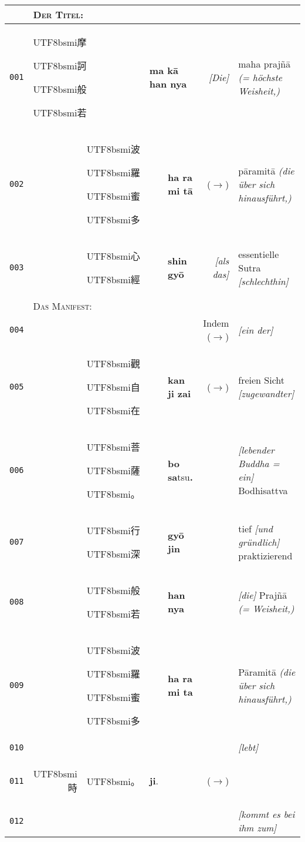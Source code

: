 \documentclass[
DIV=calc,
BCOR=5mm,
11pt,
headings=small,
oneside,
bibtotocnumbered,
english,ngerman]{scrartcl}
\newcommand{\cnbsmi}[1]{\begin{CJK}{UTF8}{bsmi}#1\end{CJK}}
\begin{document}
\begin{center}
\begin{tabular}{r|rl|rl|rl}
~ & \multicolumn{6}{l}{\textsc{Der Titel:}}\\
\hline
{\tiny\texttt{001}}&
  \multicolumn{2}{l|}{\cnbsmi{摩}  \cnbsmi{訶} \cnbsmi{般} \cnbsmi{若}} &
  \multicolumn{2}{l|}{\textbf{ma kā}  \textbf{han nya}} &
  \textrm{\emph{[Die]}}& \textrm{maha prajñā \emph{(= höchste Weisheit,)}}\\
{\tiny\texttt{002}}&
  ~ & \cnbsmi{波} \cnbsmi{羅} \cnbsmi{蜜} \cnbsmi{多} & 
  ~ & \textbf{ha ra mi tā} & 
  {\tiny \textrm{($\rightarrow$)}} & 
    \textrm{pāramitā \emph{(die über sich hinausführt,)}}\\
{\tiny\texttt{003}}& 
  ~ & \cnbsmi{心} \cnbsmi{經} &
  ~ & \textbf{shin gyō} & 
  \textrm{\emph{[als das]}} & \textrm{essentielle Sutra \emph{[schlechthin]}} \\
\hline
~ & \multicolumn{6}{l}{\textsc{Das Manifest:}}\\
\hline
{\tiny\texttt{004}}& 
~ & ~  & ~ & ~ &
  \textrm{Indem} {\tiny \textrm{($\rightarrow$)}} & \textrm{\emph{[ein der]}} \\
{\tiny\texttt{005}}&
  ~ & \cnbsmi{觀} \cnbsmi{自} \cnbsmi{在} & 
  ~ & \textbf{kan ji zai} & 
  {\tiny \textrm{($\rightarrow$)}} &
    \textrm{freien Sicht \emph{[zugewandter]}} \\
{\tiny\texttt{006}}&
  ~ & \cnbsmi{菩} \cnbsmi{薩} \cnbsmi{。}& 
  ~ & \textbf{bo} \textbf{sa}\tiny{tsu}\textbf{.}& 
  ~ & \textrm{\emph{[lebender Buddha = ein]} Bodhisattva} \\  
{\tiny\texttt{007}}& 
  ~ & \cnbsmi{行} \cnbsmi{深} &
  ~ & \textbf{gyō} \textbf{jin} & 
  ~ & \textrm{tief \emph{[und gründlich]} praktizierend} \\  
{\tiny\texttt{008}}& 
  ~ & \cnbsmi{般} \cnbsmi{若} & 
  ~ & \textbf{han nya} & 
  ~ & \textrm{\emph{[die]} Prajñā \emph{(= Weisheit,)}} \\  
{\tiny\texttt{009}} &
  ~ & \cnbsmi{波} \cnbsmi{羅} \cnbsmi{蜜} \cnbsmi{多}& 
  ~ & \textbf{ha ra mi ta} & 
  ~ & \textrm{Pāramitā \emph{(die über sich hinausführt,)}} \\  
{\tiny\texttt{010}}&
  ~ & ~  & ~ & ~ &  ~ & \textrm{\emph{[lebt]}} \\
{\tiny\texttt{011}}&
  \cnbsmi{時}&\cnbsmi{。} &
  \textbf{ji}. & ~ &
  {\tiny \textrm{($\rightarrow$)}} & ~ \\
{\tiny\texttt{012}}& 
  ~ & ~ & ~ & ~ & ~ & \textrm{\emph{[kommt es bei ihm zum]}} \\

\end{tabular}
\end{center}
\end{document}
